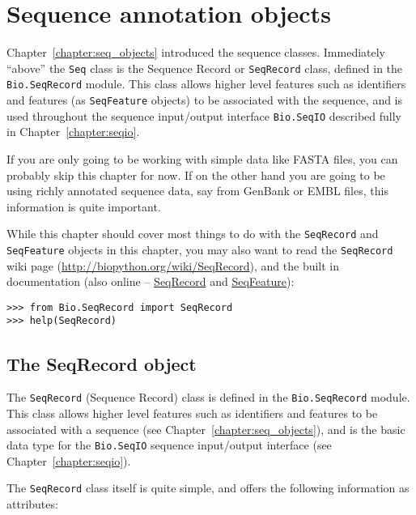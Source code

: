 \chapter{Sequence annotation objects}
\label{chapter:seq_annot}

Chapter~\ref{chapter:seq_objects} introduced the sequence classes.  Immediately ``above'' the \verb|Seq| class is the Sequence Record or \verb|SeqRecord| class, defined in the \verb|Bio.SeqRecord| module. This class allows higher level features such as identifiers and features (as \verb|SeqFeature| objects) to be associated with the sequence, and is used throughout the sequence input/output interface \verb|Bio.SeqIO| described fully in Chapter~\ref{chapter:seqio}.

If you are only going to be working with simple data like FASTA files, you can probably skip this chapter
for now. If on the other hand you are going to be using richly annotated sequence data, say from GenBank
or EMBL files, this information is quite important.

While this chapter should cover most things to do with the \verb|SeqRecord| and \verb|SeqFeature| objects in this chapter, you may also want to read the \verb|SeqRecord| wiki page (\url{http://biopython.org/wiki/SeqRecord}), and the built in documentation (also online -- \href{http://biopython.org/docs/\bpversion/api/Bio.SeqRecord.html}{SeqRecord} and \href{http://biopython.org/docs/\bpversion/api/Bio.SeqFeature.html}{SeqFeature}):

\begin{verbatim}
>>> from Bio.SeqRecord import SeqRecord
>>> help(SeqRecord)
\end{verbatim}

\section{The SeqRecord object}
\label{sec:SeqRecord}

The \verb|SeqRecord| (Sequence Record) class is defined in the \verb|Bio.SeqRecord| module. This class allows higher level features such as identifiers and features to be associated with a sequence (see Chapter~\ref{chapter:seq_objects}), and is the basic data type for the \verb|Bio.SeqIO| sequence input/output interface (see Chapter~\ref{chapter:seqio}).

The \verb|SeqRecord| class itself is quite simple, and offers the following information as attributes:

